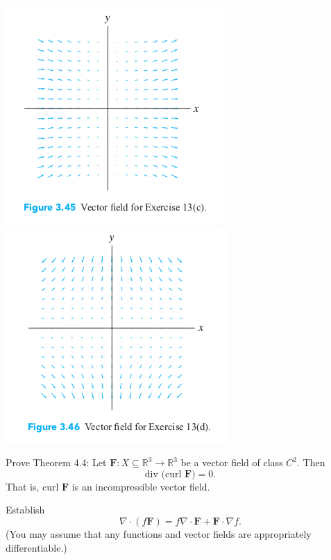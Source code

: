 \documentclass[11pt,letterpaper,boxed]{hmcpset}
\newcommand{\R}{\mathbb{R}}
\begin{document}
\begin{problem}[Colley 3.4 \#13]
\begin{center}
\includegraphics[scale=0.55]{grapC.png} \qquad
\includegraphics[scale=0.55]{grapD.png}
\end{center}
\end{problem}

\begin{solution}
\vfill
\end{solution}
\newpage

\begin{problem}[Colley 3.4 \#16]
Prove Theorem 4.4: Let $\mathbf{F}: X\subseteq \R^3\rightarrow \R^3$ be a vector field of class $C^2$. Then 
\[
	\text{div (curl }\mathbf{F}) = 0.
\]
That is, curl $\mathbf{F}$ is an
incompressible vector field.
\end{problem}

\begin{solution}
\vfill
\end{solution}
\newpage

\begin{problem}[Colley 3.4 \#23]
Establish
\[
	\nabla \cdot (f\mathbf{F}) = f\nabla \cdot \mathbf{F} + \mathbf{F}\cdot \nabla f.
\]
(You may assume that any functions and vector fields are appropriately differentiable.)
\end{problem}

\begin{solution}
\vfill
\end{solution}
\end{document}
